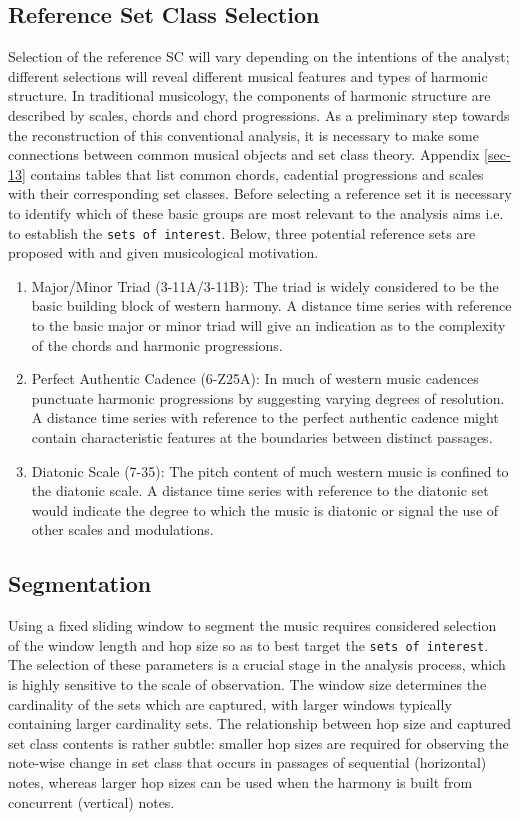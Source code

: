 \documentclass{article}
\begin{document}
\subsection{Reference Set Class Selection}
\label{sec-7-2}

Selection of the reference SC will vary depending on the intentions of
the analyst; different selections will reveal different musical
features and types of harmonic structure. In traditional musicology,
the components of harmonic structure are described by scales, chords
and chord progressions. As a preliminary step towards the
reconstruction of this conventional analysis, it is necessary to make
some connections between common musical objects and set class
theory. Appendix \ref{sec-13} contains tables that list common
chords, cadential progressions and scales with their corresponding set
classes. Before selecting a reference set it is necessary to identify
which of these basic groups are most relevant to the analysis aims
i.e. to establish the \texttt{sets of interest}. Below, three potential
reference sets are proposed with and given musicological motivation.

\begin{enumerate}
\item Major/Minor Triad (3-11A/3-11B): The triad is widely considered to
   be the basic building block of western harmony. A distance time
   series with reference to the basic major or minor triad will give
   an indication as to the complexity of the chords and harmonic
   progressions.
\item Perfect Authentic Cadence (6-Z25A): In much of western music
   cadences punctuate harmonic progressions by suggesting varying
   degrees of resolution. A distance time series with reference to the
   perfect authentic cadence might contain characteristic features at
   the boundaries between distinct passages.
\item Diatonic Scale (7-35): The pitch content of much western music is
   confined to the diatonic scale. A distance time series with
   reference to the diatonic set would indicate the degree to which
   the music is diatonic or signal the use of other scales and
   modulations.
\end{enumerate}
\subsection{Segmentation}
\label{sec-7-3}

Using a fixed sliding window to segment the music requires considered
selection of the window length and hop size so as to best target the
\texttt{sets of interest}. The selection of these parameters is a crucial
stage in the analysis process, which is highly sensitive to the scale
of observation. The window size determines the cardinality of the sets
which are captured, with larger windows typically containing larger
cardinality sets. The relationship between hop size and captured set
class contents is rather subtle: smaller hop sizes are required for
observing the note-wise change in set class that occurs in passages of
sequential (horizontal) notes, whereas larger hop sizes can be used
when the harmony is built from concurrent (vertical) notes.
\end{document}

